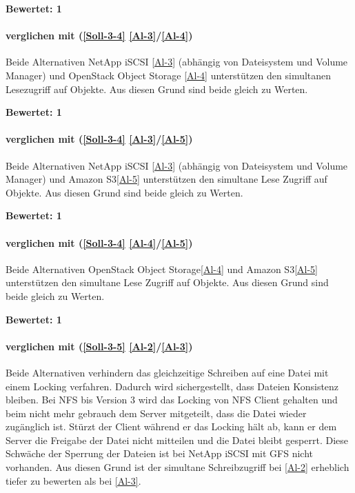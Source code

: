 \textbf{Bewertet: 1}

\paragraph*{  verglichen mit  (\ref{Soll-3-4} \ref{Al-3}/\ref{Al-4})}
Beide Alternativen NetApp iSCSI \ref{Al-3} (abhängig von Dateisystem und Volume Manager) und OpenStack Object Storage \ref{Al-4} unterstützen den simultanen Lesezugriff auf Objekte. Aus diesen Grund sind beide gleich zu Werten.

\textbf{Bewertet: 1}

\paragraph*{  verglichen mit  (\ref{Soll-3-4} \ref{Al-3}/\ref{Al-5})}
Beide Alternativen NetApp iSCSI \ref{Al-3} (abhängig von Dateisystem und Volume Manager) und Amazon S3\ref{Al-5} unterstützen den simultane Lese Zugriff auf Objekte. Aus diesen Grund sind beide gleich zu Werten.

\textbf{Bewertet: 1}


\paragraph*{  verglichen mit  (\ref{Soll-3-4} \ref{Al-4}/\ref{Al-5})}
Beide Alternativen OpenStack Object Storage\ref{Al-4} und Amazon S3\ref{Al-5} unterstützen den simultane Lese Zugriff auf Objekte. Aus diesen Grund sind beide gleich zu Werten.


\textbf{Bewertet: 1}


\paragraph*{  verglichen mit  (\ref{Soll-3-5} \ref{Al-2}/\ref{Al-3})}
Beide Alternativen verhindern das gleichzeitige Schreiben auf eine Datei mit einem Locking verfahren. Dadurch wird sichergestellt, dass Dateien Konsistenz bleiben. Bei NFS bis Version 3 wird das Locking von NFS Client gehalten und beim nicht mehr gebrauch dem Server mitgeteilt, dass die Datei wieder zugänglich ist. Stürzt der Client während er das Locking hält ab, kann er dem Server die Freigabe der Datei nicht mitteilen und die Datei bleibt gesperrt. 
Diese Schwäche der Sperrung der Dateien ist bei NetApp iSCSI mit GFS nicht vorhanden. Aus diesen Grund ist der simultane Schreibzugriff bei  \ref{Al-2} erheblich tiefer zu bewerten als bei   \ref{Al-3}.

